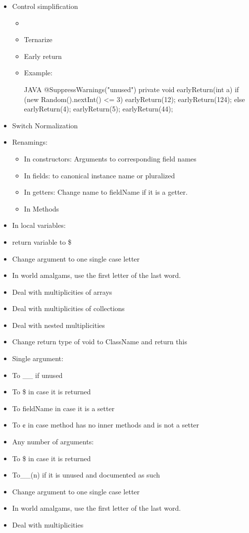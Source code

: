 \begin{itemize}
\item Control simplification
\begin{itemize}
 \item \item Ternarize
\item Early return
\item Example: 
\begin{code}{JAVA}
@SuppressWarnings("unused") private
void earlyReturn(int a) {
  if (new Random().nextInt() <= 3) {
    earlyReturn(12);
    earlyReturn(124);
    } else {
    earlyReturn(4);
    earlyReturn(5);
    earlyReturn(44);
  }
}
\end{code}
\end{itemize}
\end{itemize}

\begin{itemize}
\item Switch Normalization
\item Renamings:
\begin{itemize}
 \item In constructors: Arguments to corresponding field names
 \item In fields: to canonical instance name or pluralized
 \item In getters: Change name to fieldName if it is a getter.
 \item In Methods
\end{itemize}

\item In local variables:
\item return variable to \$
\item Change argument to one single case letter
\item In world amalgams, use the first letter of the last word.
\item Deal with multiplicities of arrays
\item Deal with multiplicities of collections
\item Deal with nested multiplicities
\item Change return type of void to ClassName and return this
\item Single argument:
\item To \_\_ if unused
\item To \$ in case it is returned
\item To fieldName in case it is a setter
\item To ¢ in case method has no inner methods and is not a setter
\item Any number of arguments:
\item To \$ in case it is returned
\item To__(n) if it is unused and documented as such
\item Change argument to one single case letter
\item In world amalgams, use the first letter of the last word.
\item Deal with multiplicities
\end{itemize}

